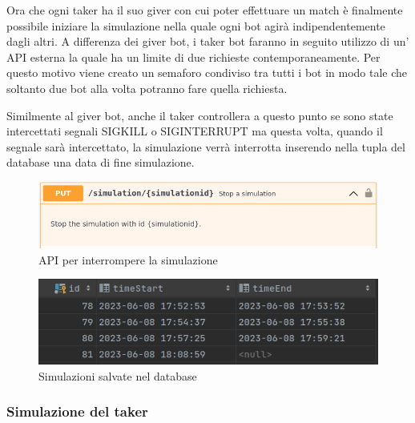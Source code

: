 \documentclass[main.tex]{subfiles}
\begin{document}


Ora che ogni taker ha il suo giver con cui poter effettuare un match è finalmente possibile iniziare la simulazione nella quale ogni bot agirà indipendentemente dagli altri.\newline
A differenza dei giver bot, i taker bot faranno in seguito utilizzo di un' API esterna la quale ha un limite di due richieste contemporaneamente. Per questo motivo viene creato un semaforo condiviso tra tutti i bot in modo tale che soltanto due bot alla volta potranno fare quella richiesta.\label{takerstart}



Similmente al giver bot, anche il taker controllera a questo punto se sono state intercettati segnali SIGKILL o SIGINTERRUPT ma questa volta, quando il segnale sarà intercettato, la simulazione verrà interrotta inserendo nella tupla del database una data di fine simulazione.
\begin{figure}[H]
    \centering
    \includegraphics[width=1\linewidth]{img/simulazione/takerbot/simulazione-stop-api.png}
    \caption{API per interrompere la simulazione}
    \label{fig:simulazione stop api}
\end{figure}

\begin{figure}[H]
    \centering
    \includegraphics[width=0.8\linewidth]{img/simulazione/takerbot/simulazione-db.png}
    \caption{Simulazioni salvate nel database}
    \label{fig:simulazione db}
\end{figure}

\subsubsection{Simulazione del taker}
\end{document}

